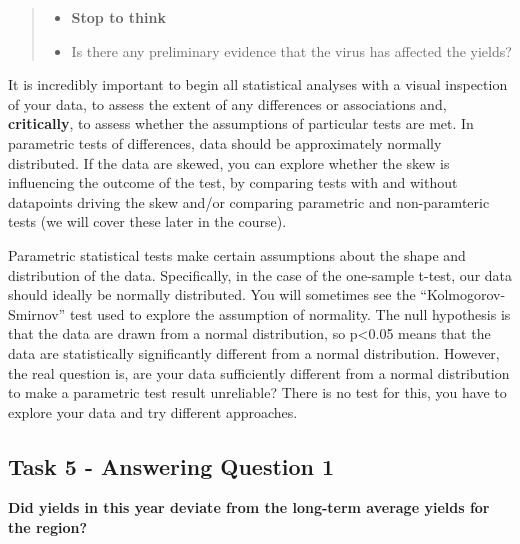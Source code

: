 \documentclass[
]{book}
\providecommand{\tightlist}{%
  \setlength{\itemsep}{0pt}\setlength{\parskip}{0pt}}
\begin{document}
\begin{quote}
\begin{itemize}
\tightlist
\item
  \textbf{Stop to think}
\item
  Is there any preliminary evidence that the virus has affected the yields?
\end{itemize}
\end{quote}

It is incredibly important to begin all statistical analyses with a visual inspection of your data, to assess the extent of any differences or associations and, \textbf{critically}, to assess whether the assumptions of particular tests are met. In parametric tests of differences, data should be approximately normally distributed. If the data are skewed, you can explore whether the skew is influencing the outcome of the test, by comparing tests with and without datapoints driving the skew and/or comparing parametric and non-paramteric tests (we will cover these later in the course).

Parametric statistical tests make certain assumptions about the shape and distribution of the data. Specifically, in the case of the one-sample t-test, our data should ideally be normally distributed. You will sometimes see the ``Kolmogorov-Smirnov'' test used to explore the assumption of normality. The null hypothesis is that the data are drawn from a normal distribution, so p\textless0.05 means that the data are statistically significantly different from a normal distribution. However, the real question is, are your data sufficiently different from a normal distribution to make a parametric test result unreliable? There is no test for this, you have to explore your data and try different approaches.

\subsection{Task 5 - Answering Question 1}\label{task-5---answering-question-1}

\textbf{Did yields in this year deviate from the long-term average yields for the region?}
\end{document}
